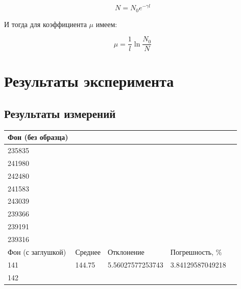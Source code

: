 \documentclass[%
reprint,
amsmath,amssymb,
aps,
]{revtex4-2}
\begin{document}
	\[N = N_{0} e^{-\gamma l}\]
	
	И тогда для коэффициента $\mu$ имеем:
	
	\[\mu = \frac{1}{l} \ln{\frac{N_{0}}{N}}\]
		
		
	\section{Результаты эксперимента}
	
	\subsection{Результаты измерений}
	
	\begin{table}[]
		\begin{tabular}{|l|l|l|l|l|}
			\hline
			Фон (без образца)          &                     &                  &                  &       \\ \hline
			235835                     &                     &                  &                  &       \\ \hline
			241980                     &                     &                  &                  &       \\ \hline
			242480                     &                     &                  &                  &       \\ \hline
			241583                     &                     &                  &                  &       \\ \hline
			243039                     &                     &                  &                  &       \\ \hline
			239366                     &                     &                  &                  &       \\ \hline
			239191                     &                     &                  &                  &       \\ \hline
			239316                     &                     &                  &                  &       \\ \hline
			Фон (с заглушкой)          & Среднее             & Отклонение       & Погрешность, \%  &       \\ \hline
			141                        & 144.75              & 5.56027577253743 & 3.84129587049218 &       \\ \hline
			142                        &                     &                  &                  &       \\ \hline

\end{tabular}
\end{table}
\end{document}
